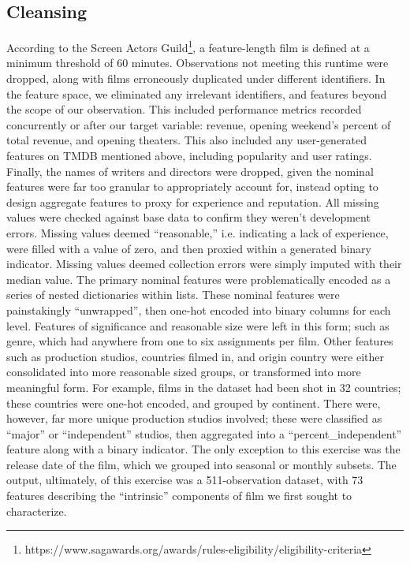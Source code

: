 \documentclass[10pt]{article}
\begin{document}
\subsection{Cleansing}
According to the Screen Actors Guild\footnote{https://www.sagawards.org/awards/rules-eligibility/eligibility-criteria}, a feature-length film is defined at a minimum threshold of 60 minutes. Observations not meeting this runtime were dropped, along with films erroneously duplicated under different identifiers. In the feature space, we eliminated any irrelevant identifiers, and features beyond the scope of our observation. This included performance metrics recorded concurrently or after our target variable: revenue, opening weekend’s percent of total revenue, and opening theaters. This also included any user-generated features on TMDB mentioned above, including popularity and user ratings. Finally, the names of writers and directors were dropped, given the nominal features were far too granular to appropriately account for, instead opting to design aggregate features to proxy for experience and reputation. 
All missing values were checked against base data to confirm they weren’t development errors. Missing values deemed “reasonable,” i.e. indicating a lack of experience, were filled with a value of zero, and then proxied within a generated binary indicator. Missing values deemed collection errors were simply imputed with their median value. 
The primary nominal features were problematically encoded as a series of nested dictionaries within lists. These nominal features were painstakingly “unwrapped”, then one-hot encoded into binary columns for each level. Features of significance and reasonable size were left in this form; such as genre, which had anywhere from one to six assignments per film. Other features such as production studios, countries filmed in, and origin country were either consolidated into more reasonable sized groups, or transformed into more meaningful form. For example, films in the dataset had been shot in 32 countries; these countries were one-hot encoded, and grouped by continent. There were, however, far more unique production studios involved; these were classified as “major” or “independent” studios, then aggregated into a “percent\_independent” feature along with a binary indicator. The only exception to this exercise was the release date of the film, which we grouped into seasonal or monthly subsets. 
The output, ultimately, of this exercise was a 511-observation dataset, with 73 features describing the “intrinsic” components of film we first sought to characterize.
\end{document}
